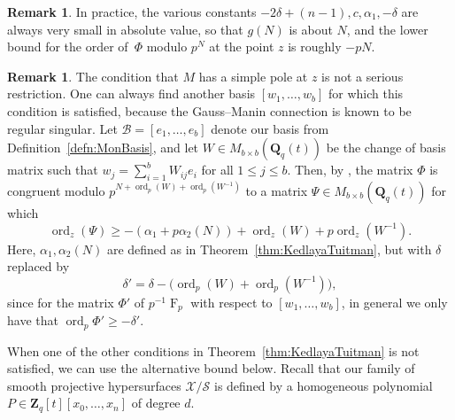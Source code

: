 \documentclass[a4paper,11pt]{article}
\numberwithin{equation}{section}
\newcommand{\ZZ}{\mathbf{Z}} %
\newcommand{\QQ}{\mathbf{Q}} %
\DeclareMathOperator{\ord}{ord}          %
\DeclareMathOperator{\Frob}{F}           %
\providecommand{\cB}{\mathcal{B}} %
\theoremstyle{definition}
\newtheorem{rem}[thm]{Remark}
\begin{document}
\begin{rem}
In practice, the various constants $-2 \delta + (n-1), c, \alpha_1, -\delta$ 
are always very small in absolute value, so that $g(N)$ is about $N$, and 
the lower bound for the order of~$\Phi$ modulo $p^N$ at the point $z$ is 
roughly $-pN$.
\end{rem}

\begin{rem}
The condition that $M$ has a simple pole at $z$ is not a serious restriction. 
One can always find another basis $[w_1, \dotsc, w_b]$ for which this condition is 
satisfied, because the Gauss--Manin connection is known to be regular singular. 
Let $\cB=[e_1,\dotsc,e_b]$ denote our basis from Definition~\ref{defn:MonBasis},
and let $W \in M_{b \times b}(\QQ_q(t))$ 
be the change of basis matrix such that $w_j = \sum_{i=1}^b W_{ij} e_i$ for all 
$1 \leq j \leq b$. Then, by \citep[Corollary 2.6]{KedlayaTuitman2012}, the matrix 
$\Phi$ %
is congruent modulo $p^{N+\ord_p(W)+\ord_p(W^{-1})}$ 
to a matrix $\Psi \in M_{b \times b}(\QQ_q(t))$ for which
\[
\ord_z(\Psi) \geq -(\alpha_1+p \alpha_2(N))+\ord_z(W)+p\ord_z(W^{-1}).
\]
Here, $\alpha_1, \alpha_2(N)$ are defined as in 
Theorem~\ref{thm:KedlayaTuitman}, but with $\delta$ replaced by
\begin{equation*}
\delta' = \delta-\bigl(\ord_p(W)+\ord_p(W^{-1})\bigr), 
\end{equation*}
since for the matrix $\Phi'$ of $p^{-1}\Frob_p$ with respect to 
$[w_1,\dotsc,w_b]$, in general we only have that $\ord_p{\Phi'} \geq -\delta'$. 
\end{rem}

When one of the other conditions in Theorem~\ref{thm:KedlayaTuitman} is not satisfied,
we can use the alternative bound below. Recall that our family of smooth projective 
hypersurfaces $\mathcal{X}/\mathcal{S}$ is defined by a homogeneous polynomial 
$P \in \ZZ_q[t][x_0,\dotsc,x_n]$ of degree $d$.
\end{document}
